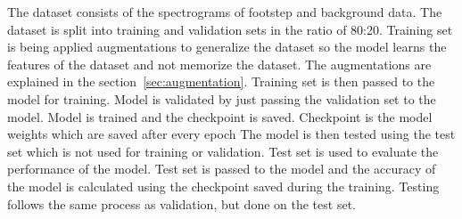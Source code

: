 The dataset consists of the spectrograms of footstep and background data. The dataset is split into training and validation sets in the ratio of 80:20. Training set is being applied augmentations to generalize the dataset so the model learns the features of the dataset and not memorize the dataset. The augmentations are explained in the section~\ref{sec:augmentation}. Training set is then passed to the model for training. Model is validated by just passing the validation set to the model. Model is trained and the checkpoint is saved. Checkpoint is the model weights which are saved after every epoch The model is then tested using the test set which is not used for training or validation. Test set is used to evaluate the performance of the model. Test set is passed to the model and the accuracy of the model is calculated using the checkpoint saved during the training. Testing follows the same process as validation, but done on the test set.  
